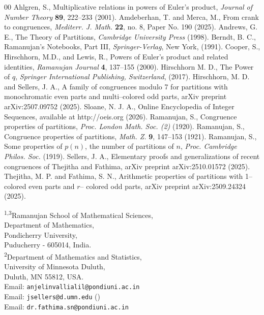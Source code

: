 \documentclass[a4paper,12pt,reqno]{amsart}
\numberwithin{equation}{section}
\begin{document}
\begin{thebibliography}{00}
	Ahlgren, S., Multiplicative relations in powers of Euler’s product, {\it Journal of Number Theory} {\bf 89}, 222–233 (2001).
	Amdeberhan, T. and Merca, M., From crank to congruences, {\it Mediterr. J. Math.} {\bf 22}, no. 8, Paper No. 190  (2025).
	Andrews, G. E., {The Theory of Partitions}, {\it Cambridge University Press} (1998).
	Berndt, B. C., Ramanujan’s Notebooks, Part III, {\it Springer-Verlag}, New York, (1991).
	Cooper, S., Hirschhorn, M.D., and Lewis, R., Powers of Euler's product and related identities, {\it Ramanujan Journal} {\bf 4}, 137–155 (2000).
	Hirschhorn M. D., The Power of $q$, {\it Springer International Publishing, Switzerland}, (2017).
	Hirschhorn, M. D. and Sellers, J. A., A family of congruences modulo 7 for partitions with monochromatic even parts and multi--colored odd parts, arXiv preprint arXiv:2507.09752 (2025).
	Sloane, N. J. A., Online Encyclopedia of Integer Sequences, available at http://oeis.org (2026).
	Ramanujan, S., Congruence properties of partitions, {\it Proc. London Math. Soc. (2)} (1920). 
	Ramanujan, S., Congruence properties of partitions, {\it Math. Z.} {\bf 9}, 147–153 (1921).
	Ramanujan, S., Some properties of $p(n)$, the number of partitions of $n$, {\it Proc. Cambridge Philos. Soc.} (1919).
	Sellers, J. A., Elementary proofs and generalizations of recent congruences of Thejitha and Fathima, arXiv preprint arXiv:2510.01572 (2025).
	Thejitha, M. P. and Fathima, S. N., Arithmetic properties of partitions with 1--colored even parts and $r$-- colored odd parts, arXiv preprint arXiv:2509.24324 (2025).
		\end{thebibliography}
		\bigskip
		
		\bigskip
		
		\noindent\textsuperscript{1,3}Ramanujan School of Mathematical Sciences,\\Department of Mathematics,\\ Pondicherry University,\\ Puducherry - 605014, India. \\
		
		
		\bigskip
		\noindent\textsuperscript{2}Department of Mathematics and Statistics, \\University of Minnesota Duluth,\\Duluth, MN 55812, USA.\bigskip\\
		
		\noindent Email: \texttt{anjelinvallialil@pondiuni.ac.in} \\
		Email: \texttt{jsellers@d.umn.edu} (\Letter)\\
		Email: \texttt{dr.fathima.sn@pondiuni.ac.in} 
\end{document}
